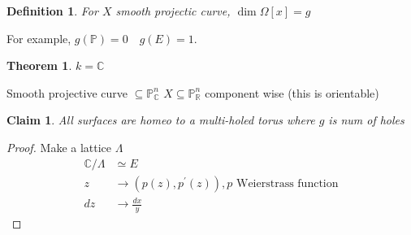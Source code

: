 \documentclass[12pt]{article}
\newcommand{\C}{\mathbb{C}}
\newcommand{\R}{\mathbb{R}}
\newtheorem{definition}{Definition}[section]
\newtheorem{theorem}{Theorem}[section]
\newtheorem{claim}{Claim}[section]
\begin{document}
\begin{definition}
For $X$ smooth projectic curve, $\operatorname{dim} \Omega[x]=g$
\end{definition}

For example, $g(\mathbb{P})=0 \quad g(E)=1$.

\begin{theorem}
$k=\mathbb{C}$
\end{theorem}
Smooth projective curve $\subseteq \mathbb{P}_{\mathbb{C}}^{n}$
$X \subseteq \mathbb{P}^{n}_{\R}$ component wise (this is orientable)

\begin{claim}
All surfaces are homeo to a multi-holed torus where $g$ is num of holes
\end{claim}

\begin{proof}
Make a lattice $\Lambda$
$$
\begin{aligned}
\C / \Lambda & \simeq E \\
z & \longrightarrow \left(p(z), p^{\prime}(z)\right), p \text { Weierstrass function} \\
d z & \longrightarrow \frac{d x}{y}
\end{aligned}
$$
\end{proof}
\end{document}
